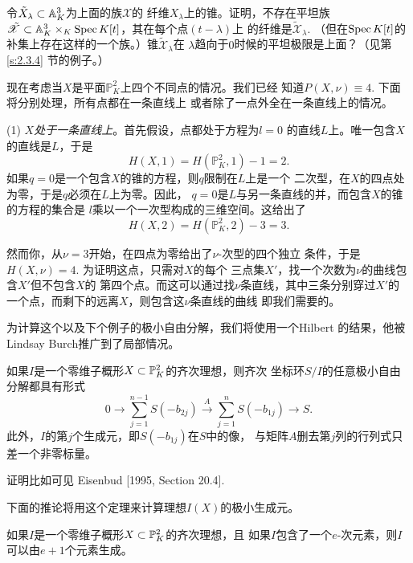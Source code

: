 \begin{exe}\label{exe:3.60}
令$\tilde{X}_{\lambda}\subset \A_K^3$为上面的族$\mathscr X$的
纤维$X_\lambda$上的锥。证明，不存在平坦族$\tilde{\mathscr X}
\subset \A_K^3\times_K \spec K[t]$，其在每个点$(t-\lambda)$上
的纤维是$\tilde{\mathscr X}_\lambda$. （但在$\spec K[t]$的
补集上存在这样的一个族。）锥$\tilde{\mathscr X}_\lambda$在
$\lambda$趋向于$0$时候的平坦极限是上面？（见第 \ref{s:2.3.4}
节的例子。）
\end{exe}

现在考虑当$X$是平面$\mathbb P_K^2$上四个不同点的情况。我们已经
知道$P(X,\nu)\equiv 4$. 下面将分别处理，所有点都在一条直线上
或者除了一点外全在一条直线上的情况。

(1) \textit{$X$处于一条直线上}。首先假设，点都处于方程为$l=0$
的直线$L$上。唯一包含$X$的直线是$L$，于是
\[
	H(X,1)=H(\mathbb P_K^2,1)-1=2.
\]
如果$q=0$是一个包含$X$的锥的方程，则$q$限制在$L$上是一个
二次型，在$X$的四点处为零，于是$q$必须在$L$上为零。因此，
$q=0$是$L$与另一条直线的并，而包含$X$的锥的方程的集合是
$l$乘以一个一次型构成的三维空间。这给出了
\[
	H(X,2)=H(\mathbb P_K^2,2)-3=3.
\]

然而你，从$\nu=3$开始，在四点为零给出了$\nu$-次型的四个独立
条件，于是$H(X,\nu)=4$. 为证明这点，只需对$X$的每个
三点集$X'$，找一个次数为$\nu$的曲线包含$X'$但不包含$X$的
第四个点。而这可以通过找$\nu$条直线，其中三条分别穿过$X'$的
一个点，而剩下的远离$X$，则包含这$\nu$条直线的曲线
即我们需要的。


为计算这个以及下个例子的极小自由分解，我们将使用一个Hilbert
的结果，他被Lindsay Burch推广到了局部情况。

\begin{thm}\label{thm:3.61}
如果$I$是一个零维子概形$X\subset \P_K^2$的齐次理想，则齐次
坐标环$S/I$的任意极小自由分解都具有形式
\[
	0\longrightarrow \sum_{j=1}^{n-1}S(-b_{2j})
	\xrightarrow{A}\sum_{j=1}^{n}S(-b_{1j})
	\longrightarrow S.
\]
此外，$I$的第$j$个生成元，即$S(-b_{1j})$在$S$中的像，
与矩阵$A$删去第$j$列的行列式只差一个非零标量。
\end{thm}

证明比如可见 Eisenbud [1995, Section 20.4].

下面的推论将用这个定理来计算理想$I(X)$的极小生成元。

\begin{coro}\label{coro:3.62}
如果$I$是一个零维子概形$X\subset \P_K^2$的齐次理想，且
如果$I$包含了一个$e$-次元素，则$I$可以由$e+1$个元素生成。
\end{coro}

